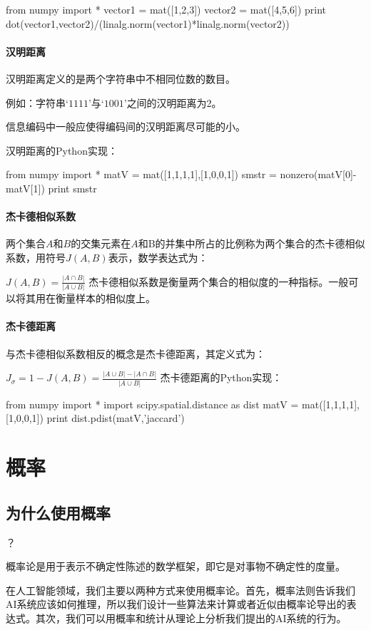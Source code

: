 \documentclass[11pt]{book}
\newcounter{#2}
\newcounter{#2}[#1]
\numberwithin{#2}{#1}
\begin{document}
from numpy import *
vector1 = mat([1,2,3])
vector2 = mat([4,5,6])
print dot(vector1,vector2)/(linalg.norm(vector1)*linalg.norm(vector2))
\paragraph{汉明距离}

汉明距离定义的是两个字符串中不相同位数的数目。

例如：字符串$ ‘1111’ $与$ ‘1001’ $之间的汉明距离为2。

信息编码中一般应使得编码间的汉明距离尽可能的小。

汉明距离的Python实现：

from numpy import *
matV = mat([1,1,1,1],[1,0,0,1])
smstr = nonzero(matV[0]-matV[1])
print smstr
\paragraph{杰卡德相似系数}

两个集合$ A $和$ B $的交集元素在$ A $和$  $B的并集中所占的比例称为两个集合的杰卡德相似系数，用符号$ J(A,B) $表示，数学表达式为：

$ J\left( A,B \right) =\frac{\left| A\cap B\right| }{\left|A\cup B \right| }  $
杰卡德相似系数是衡量两个集合的相似度的一种指标。一般可以将其用在衡量样本的相似度上。

\paragraph{杰卡德距离}

与杰卡德相似系数相反的概念是杰卡德距离，其定义式为：

$ J_{\sigma} =1-J\left( A,B \right) =\frac{\left| A\cup B \right| -\left| A\cap B \right| }{\left| A\cup B \right| }  $
杰卡德距离的Python实现：

from numpy import *
import scipy.spatial.distance as dist
matV = mat([1,1,1,1],[1,0,0,1])
print dist.pdist(matV,'jaccard')
\section{概率}

\subsection{为什么使用概率}？ 

概率论是用于表示不确定性陈述的数学框架，即它是对事物不确定性的度量。

在人工智能领域，我们主要以两种方式来使用概率论。首先，概率法则告诉我们AI系统应该如何推理，所以我们设计一些算法来计算或者近似由概率论导出的表达式。其次，我们可以用概率和统计从理论上分析我们提出的AI系统的行为。
\end{document}
